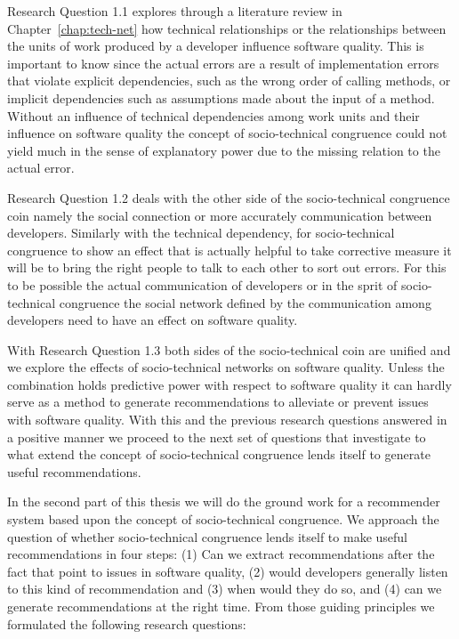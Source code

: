 Research Question 1.1 explores through a literature review in Chapter~\ref{chap:tech-net} how technical relationships or the relationships between the units of work produced by a developer influence software quality.
This is important to know since the actual errors are a result of implementation errors that violate explicit dependencies, such as the wrong order of calling methods, or implicit dependencies such as assumptions made about the input of a method. 
Without an influence of technical dependencies among work units and their influence on software quality the concept of socio-technical congruence could not yield much in the sense of explanatory power due to the missing relation to the actual error.

Research Question 1.2 deals with the other side of the socio-technical congruence coin namely the social connection or more accurately communication between developers.
Similarly with the technical dependency, for socio-technical congruence to show an effect that is actually helpful to take corrective measure it will be to bring the right people to talk to each other to sort out errors. 
For this to be possible the actual communication of developers or in the sprit of socio-technical congruence the social network defined by the communication among developers need to have an effect on software quality.

With Research Question 1.3 both sides of the socio-technical coin are unified and we explore the effects of socio-technical networks on software quality.
Unless the combination holds predictive power with respect to software quality it can hardly serve as a method to generate recommendations to alleviate or prevent issues with software quality.
With this and the previous research questions answered in a positive manner we proceed to the next set of questions that investigate to what extend the concept of socio-technical congruence lends itself to generate useful recommendations.

In the second part of this thesis we will do the ground work for a recommender system based upon the concept of socio-technical congruence.
We approach the question of whether socio-technical congruence lends itself to make useful recommendations in four steps: (1) Can we extract recommendations after the fact that point to issues in software quality, (2) would developers generally listen to this kind of recommendation and (3) when would they do so, and (4) can we generate recommendations at the right time.
From those guiding principles we formulated the following research questions:

